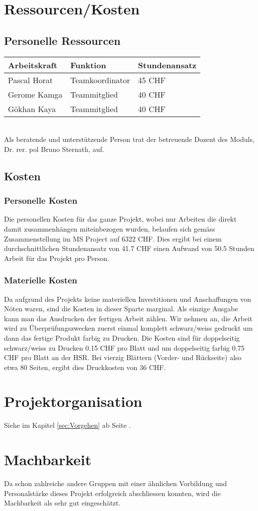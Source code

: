 \section{Ressourcen/Kosten}
\subsection{Personelle Ressourcen}
\begin{tabular}{| p{3cm} | p{4cm} | p{4cm} |}
\hline
\textbf{Arbeitskraft} & \textbf{Funktion} & \textbf{Stundenansatz} \\ \hline
Pascal Horat & Teamkoordinator & 45 CHF \\ \hline
Gerome Kamga & Teammitglied & 40 CHF \\ \hline
Gökhan Kaya & Teammitglied & 40 CHF \\ \hline

\end{tabular}\\

Als beratende und unterstützende Person trat der betreuende Dozent des Moduls, Dr. rer. pol Bruno Sternath, auf.

\subsection{Kosten}
\subsubsection{Personelle Kosten}
Die personellen Kosten für das ganze Projekt, wobei nur Arbeiten die direkt damit zusammenhängen miteinbezogen wurden, belaufen sich gemäss Zusammenstellung im MS Project auf 6322 CHF. Dies ergibt bei einem durchschnittlichen Stundenansatz von 41.7 CHF einen Aufwand von 50.5 Stunden Arbeit für das Projekt pro Person.

\subsubsection{Materielle Kosten}
Da aufgrund des Projekts keine materiellen Investitionen und Anschaffungen von Nöten waren, sind die Kosten in dieser Sparte marginal. Als einzige Ausgabe kann man das Ausdrucken der fertigen Arbeit zählen. Wir nehmen an, die Arbeit wird zu Überprüfungszwecken zuerst einmal komplett schwarz/weiss gedruckt um dann das fertige Produkt farbig zu Drucken. Die Kosten sind für doppelseitig schwarz/weiss zu Drucken 0.15 CHF pro Blatt und um doppelseitig farbig 0.75 CHF pro Blatt an der HSR. Bei vierzig Blättern (Vorder- und Rückseite) also etwa 80 Seiten, ergibt dies Druckkosten von 36 CHF.
\section{Projektorganisation}
Siehe im Kapitel \ref{sec:Vorgehen} ab Seite \pageref{sec:Vorgehen}.
\section{Machbarkeit}
Da schon zahlreiche andere Gruppen mit einer ähnlichen Vorbildung und Personalstärke dieses Projekt erfolgreich abschliessen konnten, wird die Machbarkeit als sehr gut eingeschätzt.